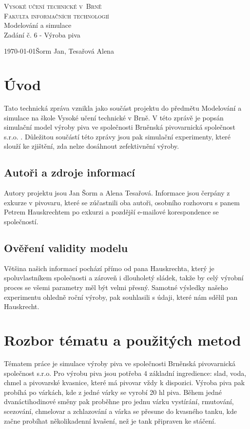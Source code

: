 \documentclass[11pt,a4paper]{article}
\author{Jan Šorm}
\begin{document}
\pagestyle{headings}
\begin{titlepage}
	\begin{center}
		{\Huge\textsc{Vysoké učení technické v~Brně}}\\
		\medskip
		{\huge\textsc{Fakulta informačních technologií}}\\
		{\LARGE Modelování a simulace}\\
		\medskip
		{\Huge Zadání č. 6 - Výroba piva}\\
	\end{center}
	{\Large\today \hfill Šorm Jan, Tesařová Alena}
\end{titlepage}

\tableofcontents
\newpage

\section{Úvod}
Tato technická zpráva vznikla jako součást projektu do předmětu Modelování a simulace na škole Vysoké učení technické v Brně. V této zprávě je popsán simulační model \cite[str. 7]{pred} výroby piva ve společnosti Brněnská pivovarnická společnost s.r.o. \cite{pivo}. Důležitou součástí této zprávy jsou pak simulační experimenty, které slouží ke zjištění, zda nelze dosáhnout zefektivnění výroby.

\subsection{Autoři a zdroje informací}
Autory projektu jsou Jan Šorm a Alena Tesařová. Informace jsou čerpány z exkurze v pivovaru, které se zúčastnili oba autoři, osobního rozhovoru s panem Petrem Hauskrechtem po exkurzi a pozdější e-mailové korespondence se společností.

\subsection{Ověření validity modelu}
Většina našich informací pochází přímo od pana Hauskrechta, který je spoluvlastníkem společnosti a zároveň i dlouholetý sládek, takže by celý výrobní proces se všemi parametry měl být velmi přesný. Samotné výsledky našeho experimentu ohledně roční výroby, pak souhlasili s údaji, které nám sdělil pan Hauskrecht.

	
\section{Rozbor tématu a použitých metod}
Tématem práce je simulace \cite[str. 8]{pred} výroby piva ve společnosti Brněnská pivovarnická společnost s.r.o. Pro výrobu piva jsou potřeba 4 základní ingredience: slad, voda, chmel a pivovarské kvasnice, které má pivovar vždy k dispozici. Výroba piva pak probíhá po várkách, kde z jedné várky se vyrobí 20 hl piva. Během jedné dvanáctihodinové směny pak proběhne pro jednu várku vystírání, rmutování, scezování, chmelovar a zchlazování a várka se přesune do kvasného tanku, kde začne probíhat několikadenní kvašení, než je tank připraven ke stáčení.
\end{document}
